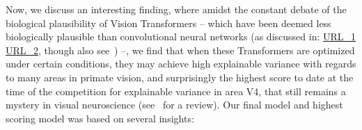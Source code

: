 \documentclass{article} %
\begin{document}
Now, we discuss an interesting finding, where amidst the constant debate of the biological plausibility of Vision Transformers -- which have been deemed less biologically plausible than convolutional neural networks (as discussed in: \href{https://twitter.com/martin_schrimpf/status/1377640443266105352}{URL\_1} \href{https://mobile.twitter.com/dileeplearning/status/1377688297296687105}{URL\_2}, though also see~\cite{conwell2021what}) --, we find that when these Transformers are optimized under certain conditions, they may achieve high explainable variance with regards to many areas in primate vision, and surprisingly the highest score to date at the time of the competition for explainable variance in area V4, that still remains a mystery in visual neuroscience (see~\cite{pasupathy2020visual} for a review). Our final model and highest scoring model was based on several insights:
\end{document}

